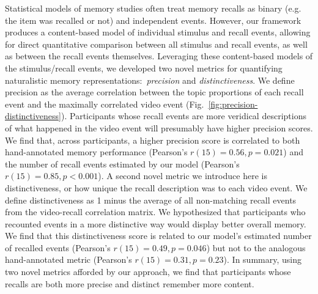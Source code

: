 \documentclass{article}
\begin{document}
Statistical models of memory studies often treat memory recalls as binary (e.g. the item was recalled or not) and independent events.  However, our framework produces a content-based model of individual stimulus and recall events, allowing for direct quantitative comparison between all stimulus and recall events, as well as between the recall events themselves.  Leveraging these content-based models of the stimulus/recall events, we developed two novel metrics for quantifying naturalistic memory representations:~\textit{precision} and \textit{distinctiveness}.  We define precision as the average correlation between the topic proportions of each recall event and the maximally correlated video event (Fig.~\ref{fig:precision-distinctiveness}).  Participants whose recall events are more veridical descriptions of what happened in the video event will presumably have higher precision scores. We find that, across participants, a higher precision score is correlated to both hand-annotated memory performance (Pearson's $r(15) = 0.56, p = 0.021$) and the number of recall events estimated by our model (Pearson's $r(15) = 0.85, p < 0.001$). A second novel metric we introduce here is distinctiveness, or how unique the recall description was to each video event. We define distinctiveness as 1 minus the average of all non-matching recall events from the video-recall correlation matrix. We hypothesized that participants who recounted events in a more distinctive way would display better overall memory.  We find that this distinctiveness score is related to our model's estimated number of recalled events (Pearson's $r(15) = 0.49, p = 0.046$) but not to the analogous hand-annotated metric (Pearson's $r(15) = 0.31, p = 0.23$).  In summary, using two novel metrics afforded by our approach, we find that participants whose recalls are both more precise and distinct remember more content.
\end{document}
